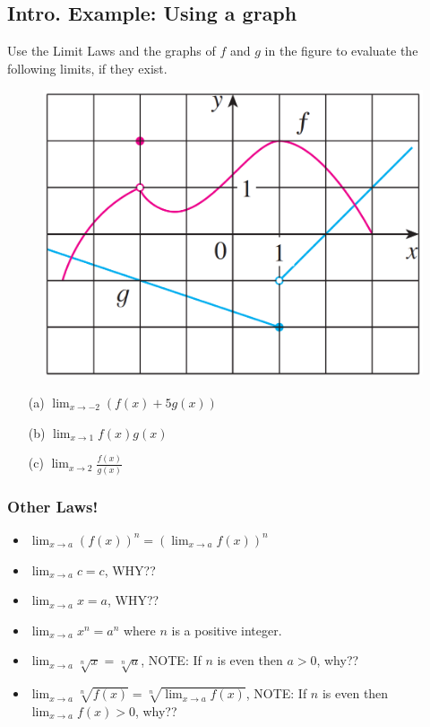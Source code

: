 \documentclass[10pt]{book}
\theoremstyle{definition}
\begin{document}
\subsection*{Intro. Example: Using a graph}
Use the Limit Laws and the graphs of $f$ and $g$ in the figure to evaluate the following limits, if they exist.
\begin{figure}[h!]
    \centering
    \includegraphics[scale=0.4]{fig1.png}
\end{figure}
\begin{itemize}
\item[(a)]$\displaystyle\lim_{x\rightarrow -2}\left(f(x)+5g(x)\right)$\vspace{2cm}
\item[(b)]$\displaystyle \lim_{x\rightarrow 1}f(x)g(x)$\vspace{2cm}
\item[(c)]$\displaystyle\lim_{x\rightarrow 2}\frac{f(x)}{g(x)}$
\end{itemize}
\clearpage
\begin{tcolorbox}
\subsubsection*{Other Laws!}
\begin{itemize}
    \item $\displaystyle\lim_{x\rightarrow a}\left(f(x)\right)^n=\left(\lim_{x\rightarrow a}f(x)\right)^n$
    \item $\displaystyle\lim_{x\rightarrow a}c=c$, WHY??
    \item $\displaystyle\lim_{x\rightarrow a}x=a$, WHY??
    \item $\displaystyle\lim_{x\rightarrow a}x^n=a^n$ where $n$ is a positive integer.
    \item $\displaystyle\lim_{x\rightarrow a}\sqrt[n]{x}=\sqrt[n]{a}$, NOTE: If $n$ is even then $a>0$, why??
    \item $\displaystyle\lim_{x\rightarrow a}\sqrt[n]{f(x)}=\sqrt[n]{\lim_{x\rightarrow a}f(x)}$, NOTE: If $n$ is even then $\displaystyle\lim_{x\rightarrow a}f(x)>0$, why??
\end{itemize}
\end{tcolorbox}
\end{document}
